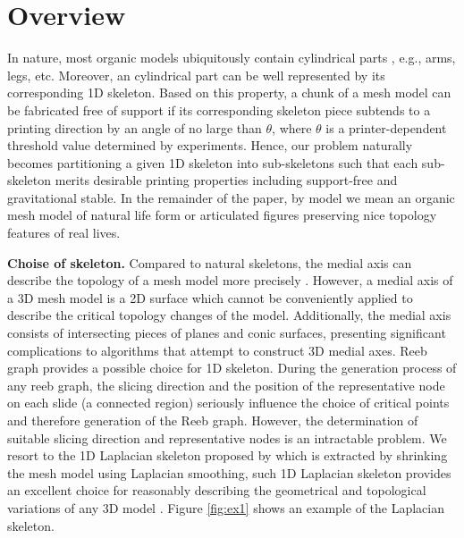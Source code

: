 \section{Overview}

In nature, most organic models ubiquitously contain cylindrical parts \cite{Zhou:2015:GCD}, e.g., arms, legs, etc. Moreover, an cylindrical part can be well represented by its corresponding 1D skeleton. Based on this property, a chunk of a mesh model can be fabricated free of support if its corresponding skeleton piece subtends to a printing direction by an angle of no large than $\theta$, where $\theta$ is a printer-dependent threshold value determined by experiments. Hence, our problem naturally becomes partitioning a given 1{D} skeleton into sub-skeletons such that each sub-skeleton merits desirable printing properties including support-free and gravitational stable. In the remainder of the paper, by model we mean an organic mesh model of natural life form or articulated figures preserving nice topology features of real lives.

\textbf{Choise of skeleton.} Compared to natural skeletons, the medial axis can describe the topology of a mesh model more precisely \cite{ZhangXWYTW15}. However, a medial axis of a 3D mesh model is a 2D surface which cannot be conveniently applied to describe the critical topology changes of the model. Additionally, the medial axis consists of intersecting pieces of planes and conic surfaces, presenting significant complications to algorithms that attempt to construct 3D medial axes.
Reeb graph provides a possible choice for 1D skeleton. During the generation process of any reeb graph, the slicing direction and the position of the representative node on each slide (a connected region) seriously influence the choice of critical points and therefore generation of the Reeb graph. However, the determination of suitable slicing direction and representative nodes is an intractable problem. We resort to the 1D Laplacian skeleton proposed by \cite{AuTCCL08} which is extracted by shrinking the mesh model using Laplacian smoothing, such 1D Laplacian skeleton provides an excellent choice for reasonably describing the geometrical and topological variations of any 3{D} model \cite{AuTCCL08}. Figure \ref{fig:ex1} shows an example of the Laplacian skeleton.

